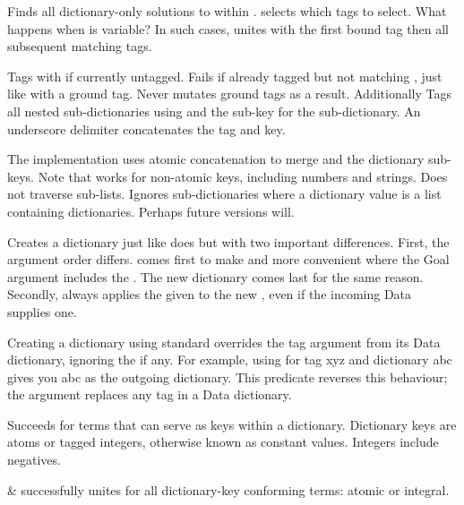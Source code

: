 \begin{description}
Finds all dictionary-only solutions to  within . 
selects which tags to select. What happens when  is variable? In
such cases, unites with the first bound tag then all subsequent
matching tags.

Tags  with  if currently untagged. Fails if already tagged
but not matching , just like  with a ground tag. Never
mutates ground tags as a result. Additionally Tags all nested
sub-dictionaries using  and the sub-key for the sub-dictionary.
An underscore delimiter concatenates the tag and key.

The implementation uses atomic concatenation to merge  and the
dictionary sub-keys. Note that  works for
non-atomic keys, including numbers and strings. Does not traverse
sub-lists. Ignores sub-dictionaries where a dictionary value is a
list containing dictionaries. Perhaps future versions will.

Creates a dictionary just like  does but with two
important differences. First, the argument order differs.  comes
first to make  and  more convenient where the
Goal argument includes the . The new dictionary  comes last
for the same reason. Secondly, always applies the given  to the
new , even if the incoming Data supplies one.

Creating a dictionary using standard  overrides the tag
argument from its Data dictionary, ignoring the  if any. For
example, using  for tag xyz and dictionary abc\Scurl{} gives
you abc\Scurl{} as the outgoing dictionary. This predicate reverses this
behaviour; the  argument replaces any tag in a Data dictionary.

Succeeds for terms that can serve as keys within a dictionary.
Dictionary keys are atoms or tagged integers, otherwise known as
constant values. Integers include negatives.

\begin{arguments}
 & successfully unites for all dictionary-key conforming
terms: atomic or integral. \\
\end{arguments}


\end{description}
